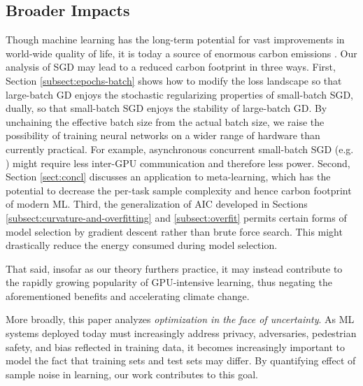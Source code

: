 \documentclass{article}
\theoremstyle{plain}
\theoremstyle{definition}
\begin{document}
    \subsection{Broader Impacts}

        Though machine learning has the long-term potential for vast
        improvements in world-wide quality of life, it is today a source of
        enormous carbon emissions \cite{st19}.  Our analysis of SGD may lead to
        a reduced carbon footprint in three ways. 
        First, Section \ref{subsect:epochs-batch} shows how to modify the loss
        landscape so that large-batch GD enjoys the stochastic
        regularizing properties of small-batch SGD, dually, so that
        small-batch SGD enjoys the stability of large-batch GD.  By
        unchaining the effective batch size from the actual batch size, we 
        raise the possibility of training neural networks on a wider range of
        hardware than currently practical.  For example, asynchronous
        concurrent small-batch SGD (e.g. \citet{ni11}) might require less
        inter-GPU communication and therefore less power.
        Second, Section \ref{sect:concl} discusses an application to
        meta-learning, which has the potential to decrease the per-task
        sample complexity and hence carbon footprint of modern ML.
        Third, the generalization of AIC developed in  Sections
        \ref{subsect:curvature-and-overfitting} and \ref{subsect:overfit}
        permits certain forms of model selection by gradient descent rather
        than brute force search.  This might drastically reduce the energy
        consumed during model selection.

        That said, insofar as our theory furthers practice, it may instead
        contribute to the rapidly growing popularity of GPU-intensive
        learning, thus negating the aforementioned benefits and accelerating
        climate change.

        More broadly, this paper analyzes \emph{optimization in the face of
        uncertainty}.  As ML systems deployed today must increasingly address
        privacy, adversaries, pedestrian safety, and bias reflected in training
        data, it becomes increasingly important to model the fact that training
        sets and test sets may differ.  By quantifying effect of sample noise
        in learning, our work contributes to this goal. 

\end{document}
